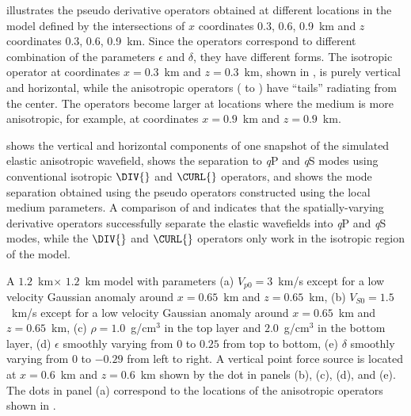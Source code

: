 illustrates the pseudo derivative operators obtained at different
locations in the model defined by the intersections of $x$ coordinates
0.3, 0.6, 0.9~km and $z$ coordinates 0.3, 0.6, 0.9~km. Since the
operators correspond to different combination of the parameters
$\epsilon$ and $\delta$, they have different forms. The isotropic
operator {at coordinates $x=0.3$~km and $z=0.3$~km, shown
in} , is purely vertical and horizontal, while
the anisotropic operators (
to ) have ``tails'' radiating from the
center. {The operators become larger at locations where the medium is
more anisotropic, for example, at coordinates $x=0.9$~km and
$z=0.9$~km.}

 shows the vertical and horizontal components of 
one snapshot of the simulated elastic anisotropic
 wavefield,  shows the separation to {\it q}P and
 {\it q}S modes using conventional {isotropic} $\DIV{}$ and $\CURL{}$ operators,
 and  shows the mode separation obtained using the
pseudo operators constructed using the local medium parameters. 
A comparison of  and  indicates
that the spatially-varying derivative operators successfully separate
the elastic wavefields into {\it q}P and {\it q}S modes, while the
$\DIV{}$ and $\CURL{}$ operators only work in the isotropic region of
the model.


{A $1.2$~km$\times$ $1.2$~km model with parameters (a) $V_{p0}=3$~km/s
except for a low velocity Gaussian anomaly around $x=0.65$~km and
$z=0.65$~km, (b) $V_{S0}=1.5$~km/s except for a low velocity Gaussian
anomaly around $x=0.65$~km and $z=0.65$~km, (c) $\rho=1.0$~g/cm$^3$ in the
top layer and $2.0$~g/cm$^3$ in the bottom layer, (d) $\epsilon$
smoothly varying from $0$ to $0.25$ from top to bottom, (e) $\delta$
smoothly varying from $0$ to $-0.29$ from left to right. A vertical
point force source is located at $x=0.6$~km and $z=0.6$~km {shown
by the dot in panels (b), (c), (d), and (e). The dots in panel (a)
correspond to the locations of the anisotropic operators shown
in 
}.  }




